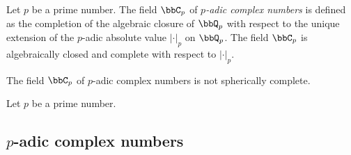     \begin{construction}\label{constr:p-adic_complex_number}
        Let \(p\) be a prime number.
        The field \(\bbC_p\) of \emph{\(p\)-adic complex numbers} is defined as the completion of the algebraic closure of \(\bbQ_p\) with respect to the unique extension of the \(p\)-adic absolute value \(|\cdot|_p\) on \(\bbQ_p\).
        The field \(\bbC_p\) is algebraically closed and complete with respect to \(|\cdot|_p\).
    \end{construction}

    \begin{proposition}\label{prop:p-adic_complex_number_is_not_spherically_complete}
        The field \(\bbC_p\) of \(p\)-adic complex numbers is not spherically complete.
    \end{proposition}

    \begin{construction}\label{constr:spherically_complete_p-adic_fields}
        Let \(p\) be a prime number.
    \end{construction}


\subsection[p-adic complex numbers]{\(p\)-adic complex numbers}

